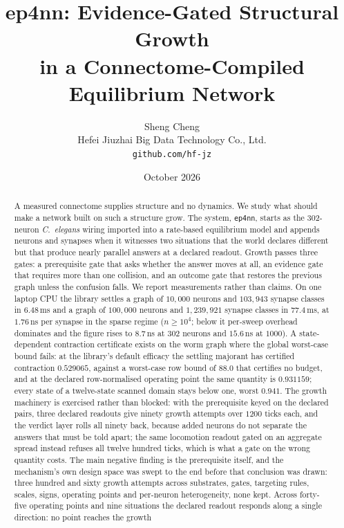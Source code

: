 \documentclass[11pt]{article}
\title{\bfseries ep4nn: Evidence-Gated Structural Growth\\[3pt]
in a Connectome-Compiled Equilibrium Network}
\author{Sheng Cheng\\ \small Hefei Jiuzhai Big Data Technology Co., Ltd.\\ \small \texttt{github.com/hf-jz}}
\date{October 2026}
\theoremstyle{remark}
\begin{document}
\maketitle

\begin{abstract}
\noindent
A measured connectome supplies structure and no dynamics. We study what should make a network
built on such a structure grow. The system, \texttt{ep4nn}, starts as the 302-neuron
\emph{C.~elegans} wiring imported into a rate-based equilibrium model and appends neurons and
synapses when it witnesses two situations that the world declares different but that produce
nearly parallel answers at a declared readout. Growth passes three gates: a prerequisite gate
that asks whether the answer moves at all, an evidence gate that requires more than one
collision, and an outcome gate that restores the previous graph unless the confusion falls. We
report measurements rather than claims. On one laptop CPU the library settles a graph of
$10{,}000$ neurons and $103{,}943$ synapse classes in $6.48$\,ms and a graph of $100{,}000$
neurons and $1{,}239{,}921$ synapse classes in $77.4$\,ms, at $1.76$\,ns per synapse in the sparse
regime ($n\ge10^4$; below it per-sweep overhead dominates and the figure rises to $8.7$\,ns at $302$
neurons and $15.6$\,ns at $1000$). A
state-dependent contraction certificate exists on the worm graph where the global worst-case
bound fails: at the library's default efficacy the settling majorant has certified contraction
$0.529065$, against a worst-case row bound of $88.0$ that certifies no budget, and at the declared
row-normalised operating point the same quantity is $0.931159$; every state of a twelve-state scanned
domain stays below one, worst $0.941$. The growth machinery is exercised rather than blocked: with the
prerequisite keyed on the declared pairs, three declared readouts give ninety growth attempts over
$1200$ ticks each, and the verdict layer rolls all ninety back, because added neurons do not separate
the answers that must be told apart; the same locomotion readout gated on an aggregate spread instead
refuses all twelve hundred ticks, which is what a gate on the wrong quantity costs. The main negative
finding is the prerequisite itself, and the mechanism's own design space was swept to the end before
that conclusion was drawn: three hundred and sixty growth attempts across substrates, gates,
targeting rules, scales, signs, operating points and per-neuron heterogeneity, none kept. Across
forty-five operating points
and nine situations the declared readout responds along a single direction: no point reaches the growth

\end{abstract}
\end{document}
